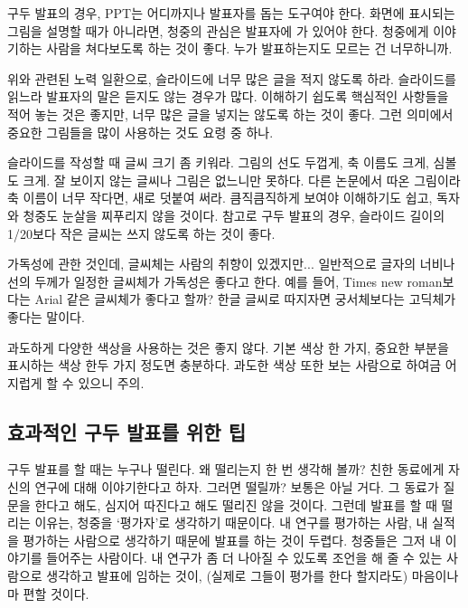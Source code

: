 \begin{packed_enum}
\item 구두 발표의 경우, PPT는 어디까지나 발표자를 돕는 도구여야 한다. 화면에
  표시되는 그림을 설명할 때가 아니라면, 청중의 관심은 발표자에 가 있어야
  한다. 청중에게 이야기하는 사람을 쳐다보도록 하는 것이 좋다. 누가 발표하는지도
  모르는 건 너무하니까.
\item 위와 관련된 노력 일환으로, 슬라이드에 너무 많은 글을 적지 않도록
  하라. 슬라이드를 읽느라 발표자의 말은 듣지도 않는 경우가 많다. 이해하기 쉽도록
  핵심적인 사항들을 적어 놓는 것은 좋지만, 너무 많은 글을 넣지는 않도록 하는 것이
  좋다. 그런 의미에서 중요한 그림들을 많이 사용하는 것도 요령 중 하나.
\item 슬라이드를 작성할 때 글씨 크기 좀 키워라. 그림의 선도 두껍게, 축 이름도
  크게, 심볼도 크게. 잘 보이지 않는 글씨나 그림은 없느니만 못하다. 다른 논문에서
  따온 그림이라 축 이름이 너무 작다면, 새로 덧붙여 써라. 큼직큼직하게 보여야
  이해하기도 쉽고, 독자와 청중도 눈살을 찌푸리지 않을 것이다. 참고로 구두 발표의
  경우, 슬라이드 길이의 1/20보다 작은 글씨는 쓰지 않도록 하는 것이 좋다.
\item 가독성에 관한 것인데, 글씨체는 사람의 취향이 있겠지만... 일반적으로 글자의
  너비나 선의 두께가 일정한 글씨체가 가독성은 좋다고 한다. 예를 들어, Times new
  roman보다는 Arial 같은 글씨체가 좋다고 할까? 한글 글씨로 따지자면 궁서체보다는
  고딕체가 좋다는 말이다.
\item 과도하게 다양한 색상을 사용하는 것은 좋지 않다. 기본 색상 한 가지, 중요한
  부분을 표시하는 색상 한두 가지 정도면 충분하다. 과도한 색상 또한 보는 사람으로
  하여금 어지럽게 할 수 있으니 주의.
\end{packed_enum}

\subsection{효과적인 구두 발표를 위한 팁}
구두 발표를 할 때는 누구나 떨린다. 왜 떨리는지 한 번 생각해 볼까? 친한 동료에게
자신의 연구에 대해 이야기한다고 하자. 그러면 떨릴까? 보통은 아닐 거다. 그 동료가
질문을 한다고 해도, 심지어 따진다고 해도 떨리진 않을 것이다. 그런데 발표를 할 때
떨리는 이유는, 청중을 ‘평가자’로 생각하기 때문이다. 내 연구를 평가하는 사람, 내
실적을 평가하는 사람으로 생각하기 때문에 발표를 하는 것이 두렵다. 청중들은 그저
내 이야기를 들어주는 사람이다. 내 연구가 좀 더 나아질 수 있도록 조언을 해 줄 수
있는 사람으로 생각하고 발표에 임하는 것이, (실제로 그들이 평가를 한다 할지라도)
마음이나마 편할 것이다.

